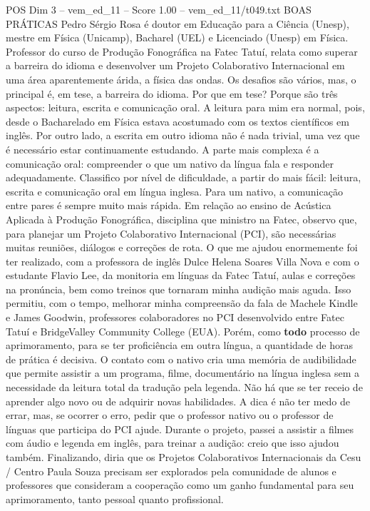 \begin{textsample}{POS Dim 3 – vem\_ed\_11 – Score 1.00 – vem\_ed\_11/t049.txt}  \label{ex:f3_pos_018}
BOAS PRÁTICAS Pedro Sérgio Rosa é doutor em Educação para a Ciência (Unesp), mestre em Física (Unicamp), Bacharel (UEL) e Licenciado (Unesp) em Física.
Professor do curso de Produção Fonográfica na Fatec Tatuí, relata como superar a barreira do idioma e desenvolver um Projeto Colaborativo Internacional em uma área aparentemente árida, a física das ondas.
Os desafios são vários, mas, o principal é, em tese, a barreira do idioma.
Por que em tese?
Porque são três aspectos: leitura, escrita e comunicação oral.
A leitura para mim era normal, pois, desde o Bacharelado em Física estava acostumado com os textos científicos em inglês.
Por outro lado, a escrita em outro idioma não é nada trivial, uma vez que é necessário estar continuamente estudando.
A parte mais complexa é a comunicação oral: compreender o que um nativo da língua fala e responder adequadamente.
Classifico por nível de dificuldade, a partir do mais fácil: leitura, escrita e comunicação oral em língua inglesa.
Para um nativo, a comunicação entre pares é sempre muito mais rápida.
Em relação ao ensino de Acústica Aplicada à Produção Fonográfica, disciplina que ministro na Fatec, observo que, para planejar um Projeto Colaborativo Internacional (PCI), são necessárias muitas reuniões, diálogos e correções de rota.
O que me ajudou enormemente foi ter realizado, com a professora de inglês Dulce Helena Soares Villa Nova e com o estudante Flavio Lee, da monitoria em línguas da Fatec Tatuí, aulas e correções na pronúncia, bem como treinos que tornaram minha audição mais aguda.
Isso permitiu, com o tempo, melhorar minha compreensão da fala de Machele Kindle e James Goodwin, professores colaboradores no PCI desenvolvido entre Fatec Tatuí e BridgeValley Community College (EUA).
Porém, como \textbf{todo} processo de aprimoramento, para se ter proficiência em outra língua, a quantidade de horas de prática é decisiva.
O contato com o nativo cria uma memória de audibilidade que permite assistir a um programa, filme, documentário na língua inglesa sem a necessidade da leitura total da tradução pela legenda.
Não há que se ter receio de aprender algo novo ou de adquirir novas habilidades.
A dica é não ter medo de errar, mas, se ocorrer o erro, pedir que o professor nativo ou o professor de línguas que participa do PCI ajude.
Durante o projeto, passei a assistir a filmes com áudio e legenda em inglês, para treinar a audição: creio que isso ajudou também.
Finalizando, diria que os Projetos Colaborativos Internacionais da Cesu / Centro Paula Souza precisam ser explorados pela comunidade de alunos e professores que consideram a cooperação como um ganho fundamental para seu aprimoramento, tanto pessoal quanto profissional.

\end{textsample}
